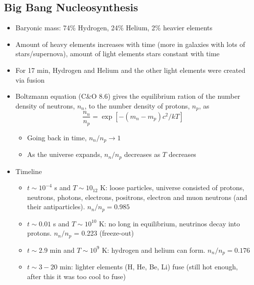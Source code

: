 \documentclass{book}
\begin{document}
\subsection{Big Bang Nucleosynthesis}
\begin{itemize}
    \item Baryonic mass: 74\% Hydrogen, 24\% Helium, 2\% heavier elements
    \item Amount of heavy elements increases with time (more in galaxies with lots of stars/supernova), amount of light elements stars constant with time
    \item For 17 min, Hydrogen and Helium and the other light elements were created via fusion
    \item Boltzmann equation (C\&O 8.6) gives the equilibrium ration of the number density of neutrons, $n_n$, to the number density of protons, $n_p$, as
          \begin{equation*}
              \frac{n_n}{n_p} = \exp\left[ - (m_n - m_p) c^2 / k T \right]
          \end{equation*}
          \begin{itemize}
              \item Going back in time, $n_n / n_p \to 1$
              \item As the universe expands, $n_n / n_p$ decreases as $T$ decreases
          \end{itemize}
    \item Timeline
          \begin{itemize}
              \item $t \sim 10^{-4}$ s and $T \sim 10_{12}$ K: loose particles, universe consisted of protons, neutrons, photons, electrons, positrons, electron and muon neutrons (and their antiparticles). $n_n / n_p = 0.985$
              \item $t \sim 0.01$ s and $T \sim 10^{10}$ K: no long in equilibrium, neutrinos decay into protons. $n_n / n_p$ = 0.223 (freeze-out)
              \item $t \sim 2.9$ min and $T \sim 10^9$ K: hydrogen and helium can form. $n_n / n_p = 0.176$
              \item $t \sim 3 - 20$ min: lighter elements (H, He, Be, Li) fuse (still hot enough, after this it was too cool to fuse)
          \end{itemize}
\end{itemize}
\end{document}
